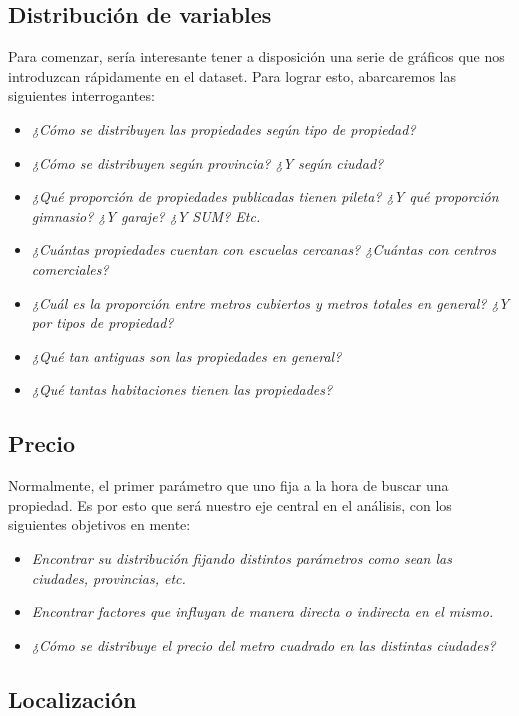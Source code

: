 \documentclass[
10pt, %
a4paper, %
oneside, %
headinclude,footinclude, %
BCOR5mm, %
]{scrartcl}
\begin{document}
\subsection{Distribuci\'on de variables}

Para comenzar, ser\'ia interesante tener a disposici\'on una serie de gr\'aficos que nos introduzcan r\'apidamente en el dataset. Para lograr esto, abarcaremos las siguientes interrogantes:
\begin{itemize}
    \item \textit{¿C\'omo se distribuyen las propiedades seg\'un tipo de propiedad?}
    \item \textit{¿C\'omo se distribuyen seg\'un provincia? ¿Y seg\'un ciudad?}
    \item \textit{¿Qu\'e proporci\'on de propiedades publicadas tienen pileta? ¿Y qu\'e proporci\'on gimnasio? ¿Y garaje? ¿Y SUM? Etc.}
    \item \textit{¿Cu\'antas propiedades cuentan con escuelas cercanas? ¿Cu\'antas con centros comerciales?}
    \item \textit{¿Cu\'al es la proporci\'on entre metros cubiertos y metros totales en general? ¿Y por tipos de propiedad?}
    \item \textit{¿Qu\'e tan antiguas son las propiedades en general?}
    \item \textit{¿Qu\'e tantas habitaciones tienen las propiedades?}
    
\end{itemize}

\subsection{Precio}

Normalmente, el primer par\'ametro que uno fija a la hora de buscar una propiedad. Es por esto que ser\'a nuestro eje central en el an\'alisis, con los siguientes objetivos en mente:
\begin{itemize}
    \item \textit{Encontrar su distribuci\'on fijando distintos par\'ametros como sean las ciudades, provincias, etc.}
    \item \textit{Encontrar factores que influyan de manera directa o indirecta en el mismo.}
    \item \textit{¿C\'omo se distribuye el precio del metro cuadrado en las distintas ciudades?}
\end{itemize}

\subsection{Localizaci\'on}
\end{document}
